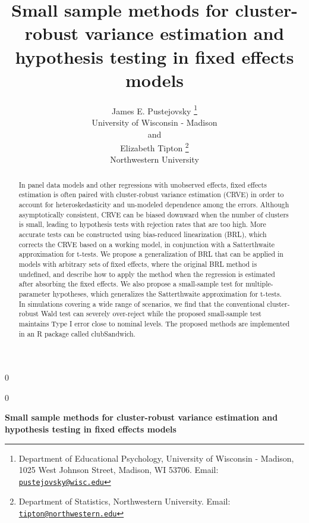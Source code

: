\documentclass[12pt]{article}
\newcommand{\blind}{0}
\begin{document}
\def\spacingset#1{\renewcommand{\baselinestretch}%
{#1}\small\normalsize} \spacingset{1}



\blind
{
  \title{\bf Small sample methods for cluster-robust variance estimation
and hypothesis testing in fixed effects models}

  \author{
        James E. Pustejovsky \thanks{Department of Educational
Psychology, University of Wisconsin - Madison, 1025 West Johnson Street,
Madison, WI 53706. Email:
\href{mailto:pustejovsky@wisc.edu}{\nolinkurl{pustejovsky@wisc.edu}}} \\
    University of Wisconsin - Madison\\
     and \\     Elizabeth Tipton \thanks{Department of Statistics,
Northwestern University. Email:
\href{mailto:tipton@northwestern.edu}{\nolinkurl{tipton@northwestern.edu}}} \\
    Northwestern University\\
      }
  \maketitle
} \fi

\blind
{
  \bigskip
  \bigskip
  \bigskip
  \begin{center}
    {\LARGE\bf Small sample methods for cluster-robust variance
estimation and hypothesis testing in fixed effects models}
  \end{center}
  \medskip
} \fi

\bigskip
\begin{abstract}
In panel data models and other regressions with unobserved effects,
fixed effects estimation is often paired with cluster-robust variance
estimation (CRVE) in order to account for heteroskedasticity and
un-modeled dependence among the errors. Although asymptotically
consistent, CRVE can be biased downward when the number of clusters is
small, leading to hypothesis tests with rejection rates that are too
high. More accurate tests can be constructed using bias-reduced
linearization (BRL), which corrects the CRVE based on a working model,
in conjunction with a Satterthwaite approximation for t-tests. We
propose a generalization of BRL that can be applied in models with
arbitrary sets of fixed effects, where the original BRL method is
undefined, and describe how to apply the method when the regression is
estimated after absorbing the fixed effects. We also propose a
small-sample test for multiple-parameter hypotheses, which generalizes
the Satterthwaite approximation for t-tests. In simulations covering a
wide range of scenarios, we find that the conventional cluster-robust
Wald test can severely over-reject while the proposed small-sample test
maintains Type I error close to nominal levels. The proposed methods are
implemented in an R package called clubSandwich.
\end{abstract}
\end{document}
